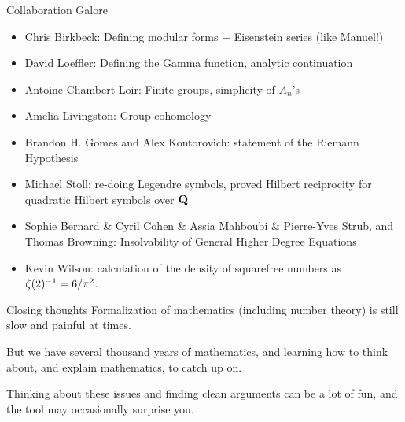 \begin{frame}{Collaboration Galore}
    \begin{itemize}
        \item Chris Birkbeck: Defining modular forms + Eisenstein series (like Manuel!)
        \item David Loeffler: Defining the Gamma function, analytic continuation
        \item Antoine Chambert-Loir: Finite groups, simplicity of $A_n$'s
        \item Amelia Livingston: Group cohomology
        \item Brandon H. Gomes and Alex Kontorovich: statement of the Riemann Hypothesis
        \item Michael Stoll: re-doing Legendre symbols, proved Hilbert reciprocity for quadratic Hilbert symbols over $\mathbf Q$
        \item Sophie Bernard \& Cyril Cohen \& Assia Mahboubi \& Pierre-Yves Strub, and Thomas Browning: Insolvability of General Higher Degree Equations
        \item Kevin Wilson: calculation of the density of squarefree numbers as $\zeta (2)^{-1} = 6 / \pi ^2 $.
    \end{itemize}
\end{frame}

\begin{frame}{Closing thoughts}
    Formalization of mathematics (including number theory) is still slow and painful at times.

    But we have several thousand years of mathematics, and learning how to think about, and explain mathematics, to catch up on.

    Thinking about these issues and finding clean arguments can be a lot of fun, and the tool may occasionally surprise you.
\end{frame}


